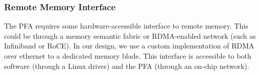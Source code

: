 \subsubsection{Remote Memory Interface}
The PFA requires some hardware-accessible interface to remote memory. This
could be through a memory semantic fabric or RDMA-enabled network (such as
Infiniband or RoCE). In our design, we use a custom implementation of RDMA over
ethernet to a dedicated memory blade. This interface is accessible to both
software (through a Linux driver) and the PFA (through an on-chip network).

